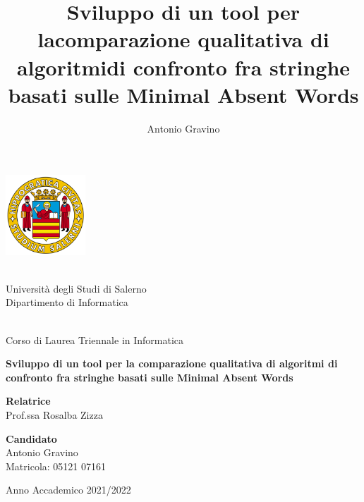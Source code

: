 \documentclass[11pt,oneside,a4paper]{book}
\begin{document}

\title{Sviluppo di un tool per lacomparazione qualitativa di algoritmidi confronto fra stringhe basati sulle Minimal Absent Words}
\author{Antonio Gravino}


\begin{titlepage}
\begin{center}

\includegraphics[width=3cm]{Figure/logo_standard.png}\\
\hfill\\
\begin{spacing}{2.0}
{\LARGE Università degli Studi di Salerno}\\
{\Large Dipartimento di Informatica}\\
\end{spacing}
\hrulefill\\
\vfill
{\Large Corso di Laurea Triennale in Informatica }\\
\vfill\vfill

\begin{spacing}{2.5}
\textbf{\Huge Sviluppo di un tool per la comparazione qualitativa di algoritmi di confronto fra stringhe basati sulle Minimal Absent Words}\\
\end{spacing}
\vfill\vfill

\begin{multicols}{2}
\begin{flushleft}
{\bf Relatrice}\\
Prof.ssa Rosalba Zizza\\
\end{flushleft}
\columnbreak
\begin{flushright}
{\bf Candidato}\\
Antonio Gravino\\
Matricola: 05121 07161\\
\end{flushright}
\end{multicols}

\vfill
\hrulefill 

Anno Accademico 2021/2022

\end{center}
\end{titlepage}
\end{document}
